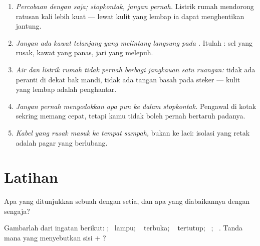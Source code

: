\begin{remark}\label{rem:g6:circuits-and-safety:rules}
\begin{enumerate}
  \item \emph{Percobaan dengan  saja; stopkontak, jangan
        pernah.} Listrik rumah mendorong ratusan kali lebih kuat ---
        lewat kulit yang lembap ia dapat menghentikan jantung.
  \item \emph{Jangan ada kawat telanjang yang melintang langsung
        pada .} Itulah : sel yang rusak, kawat yang
        panas, jari yang melepuh.
  \item \emph{Air dan listrik rumah tidak pernah berbagi jangkauan
        satu ruangan:} tidak ada peranti di dekat bak mandi, tidak
        ada tangan basah pada steker --- kulit yang lembap adalah
        penghantar.
  \item \emph{Jangan pernah menyodokkan apa pun ke dalam
        stopkontak.} Pengawal di kotak sekring memang cepat, tetapi
        kamu tidak boleh pernah bertaruh padanya.
  \item \emph{Kabel yang rusak masuk ke tempat sampah,} bukan ke
        laci: isolasi yang retak adalah pagar yang berlubang.
\end{enumerate}
\end{remark}

\section{Latihan}

\begin{exercise}[$\star$]\label{exo:g6:circuits-and-safety:1}
Apa yang ditunjukkan sebuah  dengan setia, dan apa
yang diabaikannya dengan sengaja?
\end{exercise}

\begin{exercise}[$\star$]\label{exo:g6:circuits-and-safety:2}
Gambarlah dari ingatan  berikut: ; \ lampu; \ 
terbuka; \  tertutup; \ ; \ . Tanda mana yang
menyebutkan sisi $+$ ?
\end{exercise}

